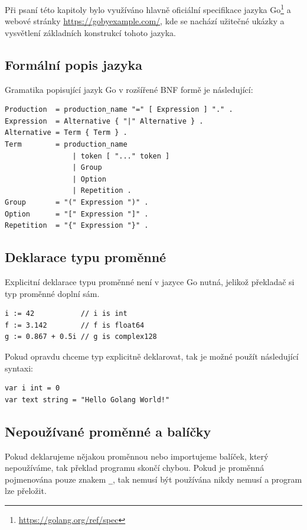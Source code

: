 \documentclass[12pt, a4paper]{article}
\begin{document}
Při psaní této kapitoly bylo využíváno hlavně oficiální specifikace jazyka Go\footnote{\url{https://golang.org/ref/spec}} a webové stránky \url{https://gobyexample.com/}, kde se nachází užitečné ukázky a vysvětlení základních konstrukcí tohoto jazyka.

\subsection{Formální popis jazyka}
Gramatika popisující jazyk Go v rozšířené BNF formě je následující:

\begin{lstlisting}
Production  = production_name "=" [ Expression ] "." .
Expression  = Alternative { "|" Alternative } .
Alternative = Term { Term } .
Term        = production_name 
                | token [ "..." token ] 
                | Group 
                | Option 
                | Repetition .
Group       = "(" Expression ")" .
Option      = "[" Expression "]" .
Repetition  = "{" Expression "}" .

\end{lstlisting}

\subsection{Deklarace typu proměnné}
Explicitní deklarace typu proměnné není v jazyce Go nutná, jelikož překladač si typ proměnné doplní sám.


\begin{lstlisting}[caption={Typ proměnné nemusí být v kódu explicitně deklarován}, captionpos=b]
i := 42           // i is int
f := 3.142        // f is float64
g := 0.867 + 0.5i // g is complex128
\end{lstlisting}

\noindent Pokud opravdu chceme typ explicitně deklarovat, tak je možné použít následující syntaxi:

\begin{lstlisting}[caption={Explicitní deklarace typu proměnné}, captionpos=b, language=Golang]
var i int = 0
var text string = "Hello Golang World!"
\end{lstlisting}


\subsection{Nepoužívané proměnné a balíčky}
Pokud deklarujeme nějakou proměnnou nebo importujeme balíček, který nepoužíváme, tak překlad programu skončí chybou. Pokud je proměnná pojmenována pouze znakem \texttt{_}, tak nemusí být používána nikdy nemusí a program lze přeložit.
\end{document}
